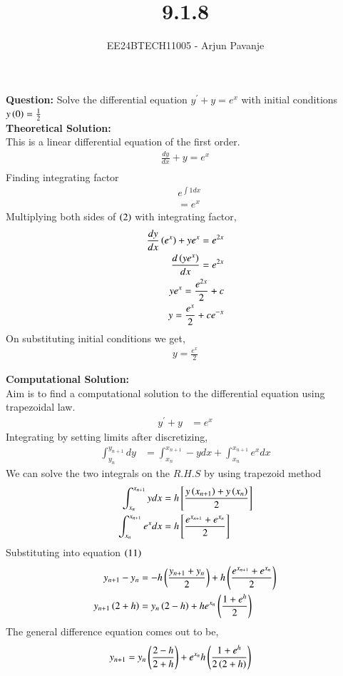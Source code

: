 \documentclass[journal]{IEEEtran}
\begin{document}

\vspace{3cm}

\title{9.1.8}
\author{EE24BTECH11005 - Arjun Pavanje}
{\let\newpage\relax\maketitle}
\textbf{Question:}
Solve the differential equation $y^{\prime}+y=e^x$ with initial conditions $y\left(0\right)=\frac{1}{2}$
\solution\\
\textbf{Theoretical Solution:}\\
This is a linear differential equation of the first order.
\begin{align}
  \frac{dy}{dx} + y = e^x\\
\end{align}
Finding integrating factor 
\begin{align}
  &e^{\int 1dx}\\
  &=e^x
\end{align}
Multiplying both sides of $\left(2\right)$ with integrating factor,
\begin{align}
  \frac{dy}{dx}\left(e^x\right) + ye^x = e^{2x}\\
  \frac{d\left(ye^x\right)}{dx}=e^{2x}\\
  ye^x=\frac{e^{2x}}{2}+c\\
  y=\frac{e^x}{2}+ce^{-x}
\end{align}
On substituting initial conditions we get,
\begin{align}
  y=\frac{e^x}{2}
\end{align}

\textbf{Computational Solution:}\\
Aim is to find a computational solution to the differential equation using trapezoidal law.
\begin{align}
  y^{\prime}+y&=e^x
\end{align}
Integrating by setting limits after discretizing,
\begin{align}
  \int_{y_n}^{y_{n+1}}dy&=\int_{x_n}^{x_{n+1}}-y dx +\int_{x_n}^{x_{n+1}} e^x dx
\end{align}
We can solve the two integrals on the $R.H.S$ by using trapezoid method
\begin{align}
  \int_{x_n}^{x_{n+1}}ydx&= h{}\left[\frac{y\left(x_{n+1}\right)+y\left(x_n\right)}{2}\right]\\
  \int_{x_n}^{x_{n+1}}e^xdx&= h{}\left[\frac{e^{x_{n+1}}+e^{x_n} }{2}\right]
\end{align}
Substituting into equation $\left(11\right)$
\begin{align}
  y_{n+1}-y_{n}&=-h\left(\frac{y_{n+1}+y_{n}}{2}\right)+h\left(\frac{e^{x_{n+1}}+e^{x_n}}{2}\right)\\
  y_{n+1}\left(2+h\right)&=y_n\left(2-h\right)+he^{x_n}\left(\frac{1+e^h}{2}\right)
\end{align}
The general difference equation comes out to be,
\begin{align}
  y_{n+1}&=y_n\left(\frac{2-h}{2+h}\right)+e^{x_n}h\left(\frac{1+e^h}{2\left(2+h\right)}\right)
\end{align}
\end{document}

